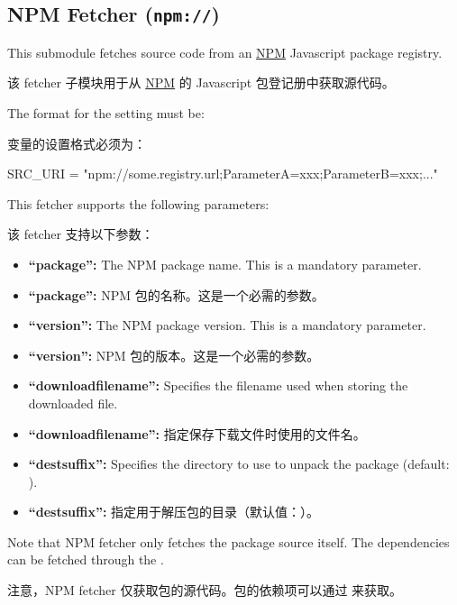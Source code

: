 \subsection{NPM Fetcher (\texttt{npm://})}

This submodule fetches source code from an \href{https://en.wikipedia.org/wiki/Npm_(software)}{NPM} Javascript package registry.

该 fetcher 子模块用于从 \href{https://en.wikipedia.org/wiki/Npm_(software)}{NPM} 的 Javascript 包登记册中获取源代码。

The format for the  setting must be:

 变量的设置格式必须为：

\begin{pyglist}
SRC_URI = "npm://some.registry.url;ParameterA=xxx;ParameterB=xxx;..."
\end{pyglist}

This fetcher supports the following parameters:

该 fetcher 支持以下参数：

\begin{itemize}
\setlength\itemsep{1.0em}
\item \textbf{``package'':} The NPM package name. This is a mandatory parameter.
\item \textbf{``package'':} NPM 包的名称。这是一个必需的参数。

\item \textbf{``version'':} The NPM package version. This is a mandatory parameter.
\item \textbf{``version'':} NPM 包的版本。这是一个必需的参数。

\item \textbf{``downloadfilename'':} Specifies the filename used when storing the downloaded file.
\item \textbf{``downloadfilename'':} 指定保存下载文件时使用的文件名。

\item \textbf{``destsuffix'':} Specifies the directory to use to unpack the package (default: ).
\item \textbf{``destsuffix'':} 指定用于解压包的目录（默认值：）。
\end{itemize}

Note that NPM fetcher only fetches the package source itself. The dependencies can be fetched through the .

注意，NPM fetcher 仅获取包的源代码。包的依赖项可以通过  来获取。

